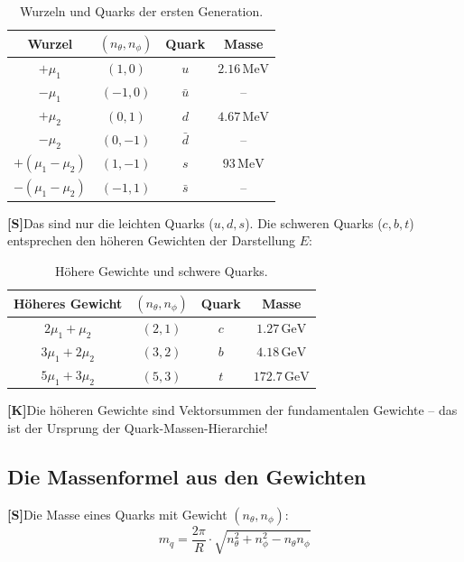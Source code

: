 \documentclass[11pt,a4paper]{article}
\newcommand{\Kstatus}{\textbf{[K]}}
\newcommand{\Sstatus}{\textbf{[S]}}
\begin{document}
	\begin{table}[h!]
		\centering
		\caption{Wurzeln und Quarks der ersten Generation.}
		\label{tab:roots_quarks}
		\begin{tabular}{c c c c}
			\toprule
			\textbf{Wurzel} & $(n_\theta, n_\phi)$ & \textbf{Quark} & \textbf{Masse} \\
			\midrule
			$+\mu_1$ & $(1, 0)$ & $u$ & $2.16\,\text{MeV}$ \\
			$-\mu_1$ & $(-1, 0)$ & $\bar{u}$ & -- \\
			$+\mu_2$ & $(0, 1)$ & $d$ & $4.67\,\text{MeV}$ \\
			$-\mu_2$ & $(0, -1)$ & $\bar{d}$ & -- \\
			$+(\mu_1 - \mu_2)$ & $(1, -1)$ & $s$ & $93\,\text{MeV}$ \\
			$-(\mu_1 - \mu_2)$ & $(-1, 1)$ & $\bar{s}$ & -- \\
			\bottomrule
		\end{tabular}
	\end{table}
	
	\Sstatus Das sind nur die leichten Quarks ($u, d, s$). Die schweren Quarks ($c, b, t$) entsprechen den höheren Gewichten der Darstellung $E$:
	
	\begin{table}[h!]
		\centering
		\caption{Höhere Gewichte und schwere Quarks.}
		\label{tab:heavy_quarks}
		\begin{tabular}{c c c c}
			\toprule
			\textbf{Höheres Gewicht} & $(n_\theta, n_\phi)$ & \textbf{Quark} & \textbf{Masse} \\
			\midrule
			$2\mu_1 + \mu_2$ & $(2, 1)$ & $c$ & $1.27\,\text{GeV}$ \\
			$3\mu_1 + 2\mu_2$ & $(3, 2)$ & $b$ & $4.18\,\text{GeV}$ \\
			$5\mu_1 + 3\mu_2$ & $(5, 3)$ & $t$ & $172.7\,\text{GeV}$ \\
			\bottomrule
		\end{tabular}
	\end{table}
	
	\Kstatus Die höheren Gewichte sind Vektorsummen der fundamentalen Gewichte -- das ist der Ursprung der Quark-Massen-Hierarchie!
	
	\subsection{Die Massenformel aus den Gewichten}
	
	\Sstatus Die Masse eines Quarks mit Gewicht $(n_\theta, n_\phi)$:
	\begin{equation}
		m_q = \frac{2\pi}{R} \cdot \sqrt{n_\theta^2 + n_\phi^2 - n_\theta n_\phi}
	\end{equation}
	
\end{document}
